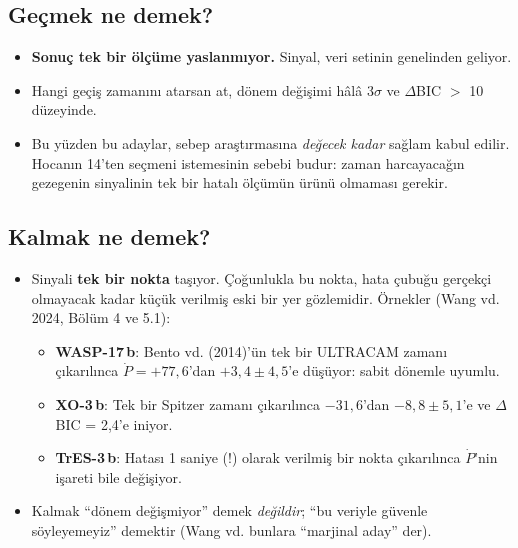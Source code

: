 \subsection{Geçmek ne demek?}
\begin{itemize}[leftmargin=*]
\item \textbf{Sonuç tek bir ölçüme yaslanmıyor.} Sinyal, veri setinin genelinden geliyor.
\item Hangi geçiş zamanını atarsan at, dönem değişimi hâlâ 3$\sigma$ ve $\Delta$BIC $>$ 10 düzeyinde.
\item Bu yüzden bu adaylar, sebep araştırmasına \emph{değecek kadar} sağlam kabul edilir. Hocanın 14'ten
      seçmeni istemesinin sebebi budur: zaman harcayacağın gezegenin sinyalinin tek bir hatalı ölçümün ürünü
      olmaması gerekir.
\end{itemize}

\subsection{Kalmak ne demek?}
\begin{itemize}[leftmargin=*]
\item Sinyali \textbf{tek bir nokta} taşıyor. Çoğunlukla bu nokta, hata çubuğu gerçekçi olmayacak kadar küçük
      verilmiş eski bir yer gözlemidir. Örnekler (Wang vd. 2024, Bölüm 4 ve 5.1):
  \begin{itemize}
  \item \textbf{WASP-17\,b}: Bento vd. (2014)'ün tek bir ULTRACAM zamanı çıkarılınca $\dot P = +77{,}6$'dan
        $+3{,}4 \pm 4{,}5$\msyil'e düşüyor: sabit dönemle uyumlu.
  \item \textbf{XO-3\,b}: Tek bir Spitzer zamanı çıkarılınca $-31{,}6$'dan $-8{,}8\pm5{,}1$'e ve
        $\Delta$BIC = 2,4'e iniyor.
  \item \textbf{TrES-3\,b}: Hatası 1 saniye (!) olarak verilmiş bir nokta çıkarılınca $\dot P$'nin işareti
        bile değişiyor.
  \end{itemize}
\item Kalmak “dönem değişmiyor” demek \emph{değildir}; “bu veriyle güvenle söyleyemeyiz” demektir
      (Wang vd. bunlara “marjinal aday” der).
\end{itemize}

